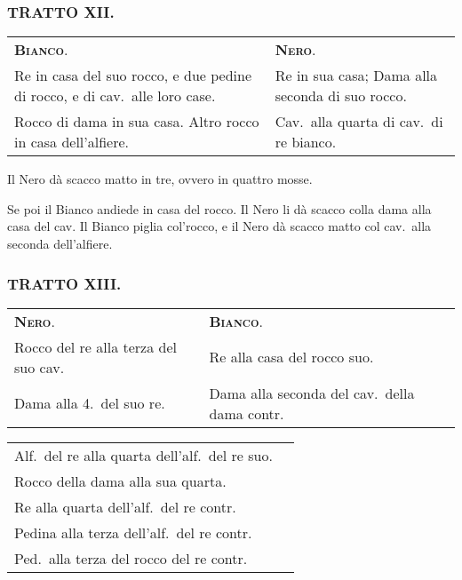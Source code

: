 \documentclass[11pt,a6paper]{article}
\begin{document}
\subsubsection{TRATTO XII.}

{\small
 \noindent\begin{tabular}{@{}p{3.84cm}p{3.84cm}}
{\bfseries\scshape Bianco}. & {\bfseries\scshape Nero}. \\
Re in casa del suo rocco,
e due pedine di rocco,
e di cav.\ alle loro case. & Re in sua casa; Dama alla seconda di suo rocco.\\
Rocco di dama in sua
casa. Altro rocco in casa
dell'alfiere. & Cav.\ alla quarta di cav.\ di re bianco.\\
\end{tabular}
}

Il Nero dà scacco matto in tre, ovvero in quattro mosse.




Se poi il Bianco andiede in casa del rocco. Il Nero
li dà scacco colla dama alla casa del cav. Il
Bianco piglia col'rocco, e il Nero dà scacco matto col
cav.\ alla seconda dell'alfiere.

\subsubsection{TRATTO XIII.}

{\small
 \noindent\begin{tabular}{@{}p{3.84cm}p{3.84cm}}
 {\bfseries\scshape Nero}. & {\bfseries\scshape Bianco}.\\
Rocco del re alla terza del suo cav. & Re alla casa del rocco suo.\\
Dama alla 4.\ del suo re. & Dama alla seconda del cav.\ della dama contr.\\
\end{tabular}

\noindent\begin{tabular}{@{}p{3.84cm}p{3.84cm}}
Alf.\ del re alla quarta
dell'alf.\ del re suo. \\
Rocco della dama alla
sua quarta. \\
Re alla quarta dell'alf.\ del re contr.\\
Pedina alla terza dell'alf.\ del re contr.\\
Ped.\ alla terza del rocco del re contr.\\
 \end{tabular}
}
\end{document}
